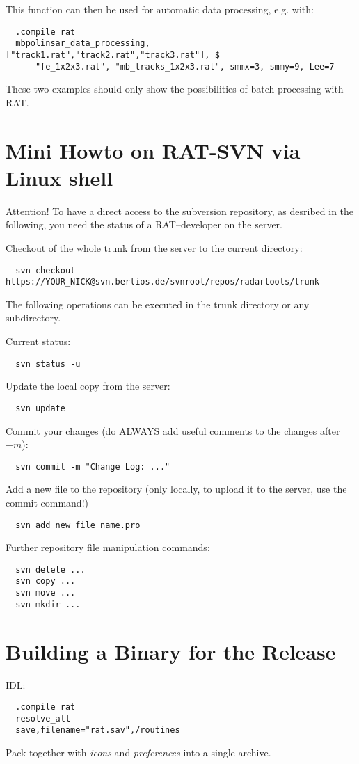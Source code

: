 This function can then be used for automatic data processing, e.g. with:
\begin{verbatim}
  .compile rat
  mbpolinsar_data_processing, ["track1.rat","track2.rat","track3.rat"], $
      "fe_1x2x3.rat", "mb_tracks_1x2x3.rat", smmx=3, smmy=9, Lee=7
\end{verbatim}
These two examples should only show the possibilities of batch processing with RAT.


\section{Mini Howto on RAT-SVN via Linux shell}
Attention! To have a direct access to the subversion repository, as desribed in
the following, you need the status of a RAT--developer on the server.

Checkout of the whole trunk from the server to the current directory:
\begin{verbatim}
  svn checkout https://YOUR_NICK@svn.berlios.de/svnroot/repos/radartools/trunk
\end{verbatim}
The following operations can be executed in the trunk directory or any
subdirectory.

Current status:
\begin{verbatim}
  svn status -u
\end{verbatim}
Update the local copy from the server:
\begin{verbatim}
  svn update
\end{verbatim}
Commit your changes (do ALWAYS add useful comments to the changes after $-m$):
\begin{verbatim}
  svn commit -m "Change Log: ..."
\end{verbatim}
Add a new file to the repository (only locally, to upload it to the server, use
the commit command!)
\begin{verbatim}
  svn add new_file_name.pro
\end{verbatim}
Further repository file manipulation commands:
\begin{verbatim}
  svn delete ...
  svn copy ...
  svn move ...
  svn mkdir ...
\end{verbatim}

\section{Building a Binary for the Release}
IDL:
\begin{verbatim}
  .compile rat
  resolve_all
  save,filename="rat.sav",/routines
\end{verbatim}
Pack together with \emph{icons} and \emph{preferences} into a single archive.
